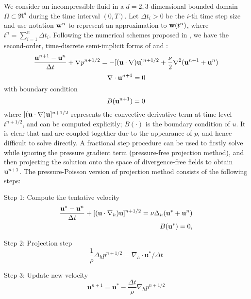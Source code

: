 We consider an incompressible fluid in a $d = 2, 3$-dimensional bounded domain $\Omega \subset \Re^d$ during the time interval $(0, T)$. Let $\Delta t_i > 0$ be the $i$-th time step size and use notation $\mathbf{w}^n$ to represent an approximation to $\mathbf{w}(t^n)$, where $t^n = \sum_{i = 1}^{n}\Delta t_i$. Following the numerical schemes proposed in \cite{Brown2001Accurate}, we have the second-order, time-discrete semi-implicit forms of  and :
\begin{equation}
\frac{\mathbf{u}^{n+1} - \mathbf{u}^n}{\Delta t} + \nabla p^{n+1/2} = 
-[(\mathbf{u}\cdot\nabla)\mathbf{u}]^{n+1/2} + \frac{\nu}{2}\nabla^2(\mathbf{u}^{n+1} + \mathbf{u}^n)
\label{dis_mom_eqn}
\end{equation}
\begin{equation}
\nabla\cdot\mathbf{u}^{n+1} = 0
\label{dis_div_free}
\end{equation}
with boundary condition
\begin{equation}
B(\mathbf{u}^{n+1}) = 0
\label{ns_bc}
\end{equation}
where $[(\mathbf{u}\cdot\nabla)\mathbf{u}]^{n+1/2}$ represents the convective derivative term at time level $t^{n+1/2}$, and can be computed explicitly\cite{Kim1985Application}; $B(\cdot)$ is the boundary condition of $u$. It is clear that  and  are coupled together due to the appearance of $p$, and hence difficult to solve directly. A fractional step procedure can be used to firstly solve  while ignoring the pressure gradient term (pressure-free projection method), and then projecting the solution onto the space of divergence-free fields to obtain $\mathbf{u}^{n+1}$. The pressure-Poisson version of projection method consists of the following steps:

Step 1: Compute the tentative velocity
\begin{eqnarray}
\frac{\mathbf{u}^*-\mathbf{u}^n}{\Delta t}+
[(\mathbf{u}\cdot\nabla_h)\mathbf{u}]^{n+1/2}
=\nu\Delta_h(\mathbf{u}^*+\mathbf{u}^n)\\ 
B(\mathbf{u}^*) = 0,
\label{tent_vel}
\end{eqnarray} 

Step 2: Projection step
\begin{equation} \frac{1}{\rho}\Delta_h p^{n+1/2} =
\nabla_h\cdot \mathbf{u}^*/\Delta t 
\end{equation}

Step 3: Update new velocity
\begin{equation} \mathbf{u}^{n+1} = \mathbf{u}^* -
\frac{\Delta t}{\rho}\nabla_h p^{n+1/2} \end{equation}

